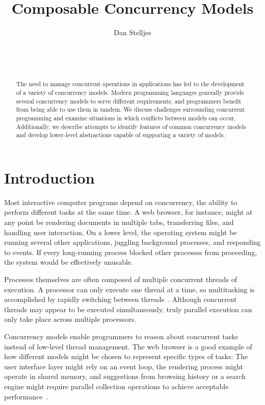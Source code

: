 \documentclass{sig-alternate}
\author{
\alignauthor{}
Dan Stelljes\\
  \affaddr{Division of Science and Mathematics}\\
  \affaddr{University of Minnesota, Morris}\\
  \affaddr{Morris, Minnesota, USA 56267}\\
  \email{stell124@morris.umn.edu}
}
\title{Composable Concurrency Models}
\begin{document}
\maketitle

\begin{abstract}

The need to manage concurrent operations in applications has led to the development of a variety of concurrency models. Modern programming languages generally provide several concurrency models to serve different requirements, and programmers benefit from being able to use them in tandem. We discuss challenges surrounding concurrent programming and examine situations in which conflicts between models can occur. Additionally, we describe attempts to identify features of common concurrency models and develop lower-level abstractions capable of supporting a variety of models.

\end{abstract}

\section{Introduction}

Most interactive computer programs depend on concurrency, the ability to perform different tasks at the same time. A web browser, for instance, might at any point be rendering documents in multiple tabs, transferring files, and handling user interaction. On a lower level, the operating system might be running several other applications, juggling background processes, and responding to events. If every long-running process blocked other processes from proceeding, the system would be effectively unusable.

Processes themselves are often composed of multiple concurrent threads of execution. A processor can only execute one thread at a time, so multitasking is accomplished by rapidly switching between threads~\cite{Liu1973}. Although concurrent threads may appear to be executed simultaneously, truly parallel execution can only take place across multiple processors.

Concurrency models enable programmers to reason about concurrent tasks instead of low-level thread management. The web browser is a good example of how different models might be chosen to represent specific types of tasks: The user interface layer might rely on an event loop, the rendering process might operate in shared memory, and suggestions from browsing history or a search engine might require parallel collection operations to achieve acceptable performance~\cite{Marr2012}.
\end{document}
